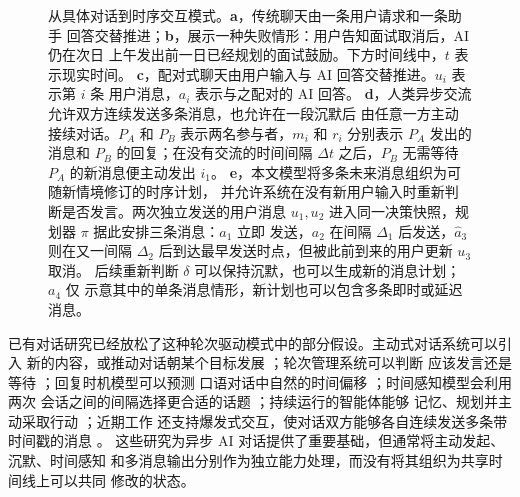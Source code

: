 \documentclass[manuscript,nonacm]{acmart}
\begin{document}
\begin{figure}[t]
  \centering
  \resizebox{0.98\textwidth}{!}{}
  \caption{从具体对话到时序交互模式。\textbf{a}，传统聊天由一条用户请求和一条助手
  回答交替推进；\textbf{b}，展示一种失败情形：用户告知面试取消后，AI 仍在次日
  上午发出前一日已经规划的面试鼓励。下方时间线中，$t$ 表示现实时间。
  \textbf{c}，配对式聊天由用户输入与 AI 回答交替推进。$u_i$ 表示第 $i$ 条
  用户消息，$a_i$ 表示与之配对的 AI 回答。
  \textbf{d}，人类异步交流允许双方连续发送多条消息，也允许在一段沉默后
  由任意一方主动接续对话。$P_A$ 和 $P_B$ 表示两名参与者，$m_i$ 和 $r_i$
  分别表示 $P_A$ 发出的消息和 $P_B$ 的回复；在没有交流的时间间隔
  $\Delta t$ 之后，$P_B$ 无需等待 $P_A$ 的新消息便主动发出 $i_1$。
  \textbf{e}，本文模型将多条未来消息组织为可随新情境修订的时序计划，
  并允许系统在没有新用户输入时重新判断是否发言。两次独立发送的用户消息
  $u_1,u_2$ 进入同一决策快照，规划器 $\pi$ 据此安排三条消息：$a_1$ 立即
  发送，$a_2$ 在间隔 $\Delta_1$ 后发送，$\widehat{a}_3$ 则在又一间隔
  $\Delta_2$ 后到达最早发送时点，但被此前到来的用户更新 $u_3$ 取消。
  后续重新判断 $\delta$ 可以保持沉默，也可以生成新的消息计划；$a_4$ 仅
  示意其中的单条消息情形，新计划也可以包含多条即时或延迟消息。}
  \label{fig:timeline}
\end{figure}

已有对话研究已经放松了这种轮次驱动模式中的部分假设。主动式对话系统可以引入
新的内容，或推动对话朝某个目标发展
\cite{li2016stalemate,wu2019duconv,deng2023survey}；轮次管理系统可以判断
应该发言还是等待 \cite{lan2019when,lin2020wait}；回复时机模型可以预测
口语对话中自然的时间偏移 \cite{roddy2020timings}；时间感知模型会利用两次
会话之间的间隔选择更合适的话题 \cite{zhang2023gap}；持续运行的智能体能够
记忆、规划并主动采取行动 \cite{park2023generative,liu2025inner}；近期工作
还支持爆发式交互，使对话双方能够各自连续发送多条带时间戳的消息
\cite{wu2025xturing}。
这些研究为异步 AI 对话提供了重要基础，但通常将主动发起、沉默、时间感知
和多消息输出分别作为独立能力处理，而没有将其组织为共享时间线上可以共同
修改的状态。
\end{document}
